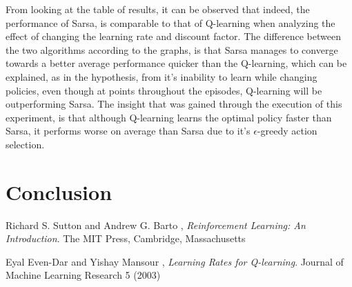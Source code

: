 \documentclass[11pt]{article}
\begin{document}
From looking at the table of results, it can be observed that indeed, the performance of Sarsa, is comparable to that of Q-learning when analyzing the effect of changing the learning rate and discount factor. The difference between the two algorithms according to the graphs, is that Sarsa manages to converge towards a better average performance quicker than the Q-learning, which can be explained, as in the hypothesis, from it's inability to learn while changing policies, even though at points throughout the episodes, Q-learning will be outperforming Sarsa.
The insight that was gained through the execution of this experiment, is that although Q-learning learns the optimal policy faster than Sarsa, it performs worse on average than Sarsa due to it's $\epsilon$-greedy action selection.









\section{Conclusion}

\begin{thebibliography}{9}

  Richard S. Sutton and Andrew G. Barto ,
  \emph{Reinforcement Learning: An Introduction}.
  The MIT Press, Cambridge, Massachusetts

  Eyal Even-Dar and Yishay Mansour ,
  \emph{Learning Rates for Q-learning}.
  Journal of Machine Learning Research 5 (2003)

\end{thebibliography}
\end{document}
